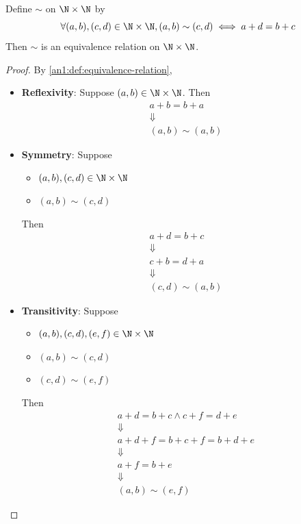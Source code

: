 \begin{theorem} \label{an1:thm:integer-construction-relation-is-equivalence}
  Define $\sim$ on $\N \times \N$ by
  \[
    \forall (a, b), (c, d) \in \N \times \N, (a, b) \sim (c, d) \iff a + d = b + c
  \]
  Then $\sim$ is an equivalence relation on $\N \times \N$.
\end{theorem}

\begin{proof}
  By \cref{an1:def:equivalence-relation},
  \begin{itemize}
    \item \textbf{Reflexivity}: Suppose $(a, b) \in \N \times \N$. Then
          \[
            \begin{array}{c}
              a + b = b + a \\
              \Downarrow    \\
              (a, b) \sim (a, b)
            \end{array}
          \]
    \item \textbf{Symmetry}: Suppose
          \begin{itemize}
            \item $(a, b), (c, d) \in \N \times \N$
            \item $(a, b) \sim (c, d)$
          \end{itemize}
          Then
          \[
            \begin{array}{c}
              a + d = b + c \\
              \Downarrow    \\
              c + b = d + a \\
              \Downarrow    \\
              (c, d) \sim (a, b)
            \end{array}
          \]
    \item \textbf{Transitivity}: Suppose
          \begin{itemize}
            \item $(a, b), (c, d), (e, f) \in \N \times \N$
            \item $(a, b) \sim (c, d)$
            \item $(c, d) \sim (e, f)$
          \end{itemize}
          Then
          \[
            \begin{array}{c}
              a + d = b + c \land c + f = d + e \\
              \Downarrow                        \\
              a + d + f = b + c + f = b + d + e \\
              \Downarrow                        \\
              a + f = b + e                     \\
              \Downarrow                        \\
              (a, b) \sim (e, f)
            \end{array}
          \]
  \end{itemize}
\end{proof}


